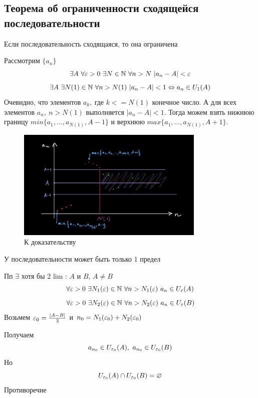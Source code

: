 \newpage

\subsection{Теорема об ограниченности сходящейся последовательности}
\begin{theorem}
    Если последовательность сходящаяся, то она ограничена
\end{theorem}
\begin{Proof}
    Рассмотрим $\{a_n\}$
    $$ \exists A\ \forall \varepsilon > 0\ \exists N \in \mathbb{N}\ \forall n > N\ |a_n - A| < \varepsilon $$
    $$ \exists A\ \exists N(1) \in \mathbb{N}\ \forall n > N(1)\ |a_n - A| < 1 \Leftrightarrow a_n \in U_1(A) $$
    Очевидно, что элементов $a_k,\ $где $ k <= N(1)$ конечное число. А для всех элементов $a_n,\ n > N(1)$ выполняется $|a_n - A| < 1$. Тогда можем взять нижнюю границу $min\{a_1,\ldots,a_{N(1)}, A-1\}$ и верхнюю $max\{a_1,\ldots,a_{N(1)}, A+1\}$.
\end{Proof}

\begin{figure}[h]
  \centering
  \includegraphics[width=0.8\textwidth]{lectures/files/lec_3_19.09.2025-14-15-52.png}
  \caption{К доказательству}
  \label{fig:lec_3_19.09.2025-14-15-52.png}
\end{figure}

\begin{theorem}
    У последовательности может быть только 1 предел
\end{theorem}

\begin{Proof}
    Пп $\exists$ хотя бы 2 lim : $A$ и $B$, $A \neq B$
    $$ \forall \varepsilon > 0\ \exists N_1(\varepsilon) \in \mathbb{N}\ \forall n > N_1(\varepsilon)\ a_n \in U_{\varepsilon}(A) $$
    $$ \forall \eps > 0\ \exists N_2(\eps) \in \N\ \forall n > N_2(\eps)\ a_n \in U_{\eps}(B) $$
    Возьмем $\varepsilon_0 = \frac{|A - B|}{3}$ и $n_0 = N_1(\varepsilon_0) + N_2(\varepsilon_0) $

    Получаем
    $$ a_{n_0} \in U_{\eps_0}(A),\ a_{n_0} \in U_{\eps_0}(B) $$
    Но 
    $$ U_{\varepsilon_0}(A) \cap U_{\varepsilon_0}(B) = \varnothing $$
    Противоречие
\end{Proof}

